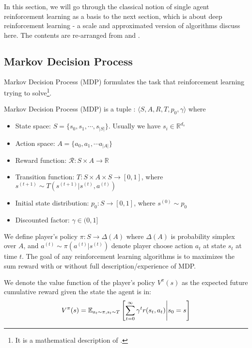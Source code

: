 \label{sec:chap2-single-rl}
In this section, we will go through the classical notion of single agent reinforcement learning as a basis to the next section, which is about deep reinforcement learning - a scale and approximated version of algorithms discuss here. The contents are re-arranged from \cite{sutton2018reinforcement} and \cite{silver}.

\subsection{Markov Decision Process}
\label{sec:chap2-rl-defintions}
Markov Decision Process (MDP) formulates the task that reinforcement learning trying to solve\footnote{It is a mathematical description of .}. 
\begin{definition}
    Markov Decision Process (MDP) is a tuple : $\langle S, A, R, T, p_0, \gamma \rangle$ where 
    \begin{itemize}
        \item State space: $S = \{s_0, s_1, \cdots , s_{|S|}\}$. Usually we have $s_i \in \mathbb{R}^{d_s}$
        \item Action space: $A = \{a_0, a_1, \cdots a_{|A|}\}$
        \item Reward function: $\mathcal{R}: S \times A \rightarrow \mathbb{R}$
        \item Transition function: $T: S \times A \times S \rightarrow [0, 1]$, where $s^{(t+1)} \sim T(s^{(t+1)} | s^{(t)}, a^{(t)})$ 
        \item Initial state distribution: $p_0 : S \rightarrow [0, 1] $, where $s^{(0)} \sim p_0$
        \item Discounted factor: $\gamma \in (0, 1]$
    \end{itemize}
    We define player's policy $\pi: S \rightarrow \Delta(A)$ where $\Delta(A)$ is probability simplex over $A$, and $a^{(t)} \sim \pi(a^{(t)} | s^{(t)})$ denote player choose action $a_t$ at state $s_t$ at time $t$. The goal of any reinforcement learning algorithms is to maximizes the sum reward with or without full description/experience of MDP.
\end{definition}
\noindent
We denote the value function of the player's policy $V^\pi(s)$ as the expected future cumulative reward given the state the agent is in:
\begin{equation}
    V^\pi(s) = \mathbb{E}_{a_t \sim \pi, s_t \sim T}\left[ \sum^\infty_{t=0} \gamma^t r(s_t, a_t) \Bigg| s_0 = s \right]
\end{equation}
